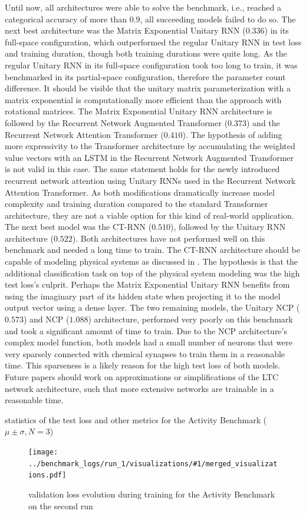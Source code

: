 \documentclass[draft,final]{vutinfth} %
\newcommand{\benchmarksummary}[2]{
    \begin{table}
        \centering{}
        \resizebox{\linewidth}{!}{\csvautotabular[options]{../benchmark_logs/statistics/#1.csv}}
        \caption{statistics of the test loss and other metrics for the #2 Benchmark ($\mu \pm \sigma, N=3$)}
        \label{tab:test_loss_#1}
    \end{table}
    \begin{figure}[h]
        \centering{}
        \texttt{[image: ../benchmark\_logs/run\_1/visualizations/\#1/merged\_visualizations.pdf]}
        \caption{validation loss evolution during training for the #2 Benchmark on the second run}
        \label{fig:validation_loss_#1}
    \end{figure}
    \clearpage{}
}
\begin{document}
    Until now, all architectures were able to solve the benchmark, i.e., reached a categorical accuracy of more than $0.9$, all succeeding models failed to do so.
    The next best architecture was the Matrix Exponential Unitary RNN ($0.336$) in its full-space configuration, which outperformed the regular Unitary RNN in test loss and training duration, though both training durations were quite long.
    As the regular Unitary RNN in its full-space configuration took too long to train, it was benchmarked in its partial-space configuration, therefore the parameter count difference.
    It should be visible that the unitary matrix parameterization with a matrix exponential is computationally more efficient than the approach with rotational matrices.
    The Matrix Exponential Unitary RNN architecture is followed by the Recurrent Network Augmented Transformer ($0.373$) and the Recurrent Network Attention Transformer ($0.410$).
    The hypothesis of adding more expressivity to the Transformer architecture by accumulating the weighted value vectors with an LSTM in the Recurrent Network Augmented Transformer is not valid in this case.
    The same statement holds for the newly introduced recurrent network attention using Unitary RNNs used in the Recurrent Network Attention Transformer.
    As both modifications dramatically increase model complexity and training duration compared to the standard Transformer architecture, they are not a viable option for this kind of real-world application.
    The next best model was the CT-RNN ($0.510$), followed by the Unitary RNN architecture ($0.522$).
    Both architectures have not performed well on this benchmark and needed a long time to train.
    The CT-RNN architecture should be capable of modeling physical systems as discussed in .
    The hypothesis is that the additional classification task on top of the physical system modeling was the high test loss's culprit.
    Perhaps the Matrix Exponential Unitary RNN benefits from using the imaginary part of its hidden state when projecting it to the model output vector using a dense layer.
    The two remaining models, the Unitary NCP ($0.573$) and NCP ($1.088$) architecture, performed very poorly on this benchmark and took a significant amount of time to train.
    Due to the NCP architecture's complex model function, both models had a small number of neurons that were very sparsely connected with chemical synapses to train them in a reasonable time.
    This sparseness is a likely reason for the high test loss of both models.
    Future papers should work on approximations or simplifications of the LTC network architecture, such that more extensive networks are trainable in a reasonable time.
    \benchmarksummary{activity}{Activity}
\end{document}
